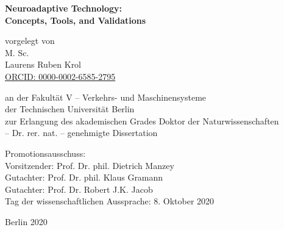 \cleardoublepage
\thispagestyle{empty}

\begin{center}

    {\Huge\bfseries Neuroadaptive Technology: \\ Concepts, Tools, and Validations}
    
    \vfill
    
    vorgelegt von \\
    M. Sc. \\
    Laurens Ruben Krol \\
    \href{https://orcid.org/0000-0002-6585-2795}{ORCID: 0000-0002-6585-2795}
    
    \vfill
    
    an der Fakultät V -- Verkehrs- und Maschinensysteme \\
    der Technischen Universität Berlin \\
    zur Erlangung des akademischen Grades
    \vspace{\baselineskip}\linebreak
    Doktor der Naturwissenschaften \\
    -- Dr. rer. nat. --
    \vspace{\baselineskip}\linebreak
    genehmigte Dissertation

\end{center}

\vfill

{\parindent 0pt 

    Promotionsausschuss: \\
    
    Vorsitzender: Prof. Dr. phil. Dietrich Manzey \\
    Gutachter: Prof. Dr. phil. Klaus Gramann \\
    Gutachter: Prof. Dr. Robert J.K. Jacob \\
    
    Tag der wissenschaftlichen Aussprache: 8. Oktober 2020
    
}

\vfill

\begin{center}

    Berlin 2020
    
\end{center}

\clearpage